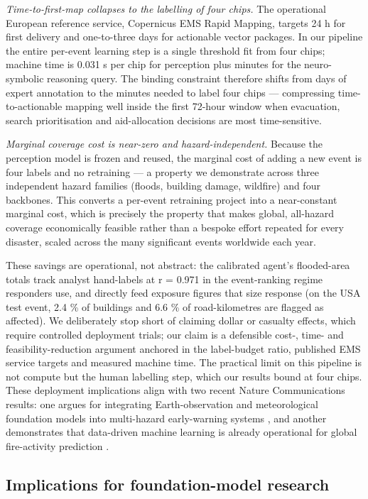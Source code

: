 \documentclass[sn-nature,lineno]{sn-jnl}
\theoremstyle{thmstyleone}
\theoremstyle{thmstyletwo}
\theoremstyle{thmstylethree}
\begin{document}
\emph{Time-to-first-map collapses to the labelling of four chips.} The
operational European reference service, Copernicus EMS Rapid Mapping,
targets 24 h for first delivery and one-to-three days for actionable
vector packages. In our pipeline the entire per-event learning step is a
single threshold fit from four chips; machine time is 0.031 s per chip
for perception plus minutes for the neuro-symbolic reasoning query. The
binding constraint therefore shifts from days of expert annotation to
the minutes needed to label four chips --- compressing time-to-actionable
mapping well inside the first 72-hour window when evacuation, search
prioritisation and aid-allocation decisions are most time-sensitive.

\emph{Marginal coverage cost is near-zero and hazard-independent.} Because
the perception model is frozen and reused, the marginal cost of adding a
new event is four labels and no retraining --- a property we demonstrate
across three independent hazard families (floods, building damage,
wildfire) and four backbones. This converts a per-event retraining
project into a near-constant marginal cost, which is precisely the
property that makes global, all-hazard coverage economically feasible
rather than a bespoke effort repeated for every disaster, scaled across
the many significant events worldwide each year.

These savings are operational, not abstract: the calibrated agent's
flooded-area totals track analyst hand-labels at r = 0.971 in the
event-ranking regime responders use, and directly feed exposure figures
that size response (on the USA test event, 2.4 \% of buildings and 6.6
\% of road-kilometres are flagged as affected). We deliberately stop
short of claiming dollar or casualty effects, which require controlled
deployment trials; our claim is a defensible cost-, time- and
feasibility-reduction argument anchored in the label-budget ratio,
published EMS service targets and measured machine time. The practical
limit on this pipeline is not compute but the human labelling step,
which our results bound at four chips. These deployment implications align with two recent
Nature Communications results: one argues for integrating
Earth-observation and meteorological foundation models into multi-hazard
early-warning systems \cite{reichstein2025earlywarning}, and another
demonstrates that data-driven machine learning is already operational
for global fire-activity prediction \cite{digiuseppe2025fireactivity}.

\subsection{Implications for foundation-model research}\label{implications-for-foundation-model-research}
\end{document}

